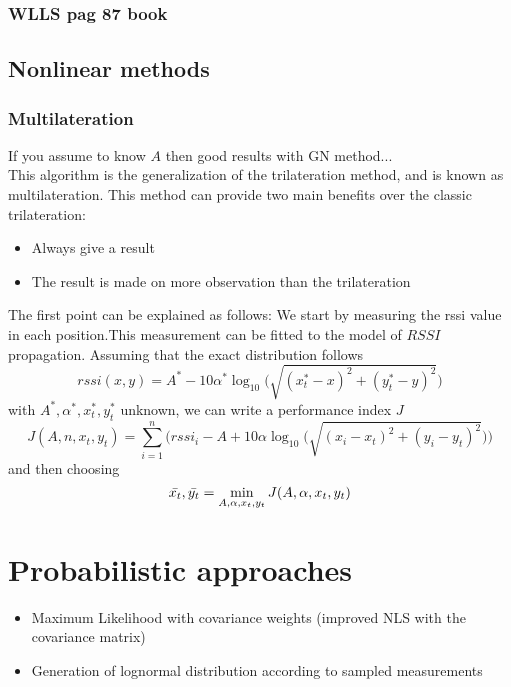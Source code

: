\documentclass[12pt]{article}
\begin{document}
\subsubsection{WLLS pag 87 book}

\clearpage

\subsection{Nonlinear methods}
\subsubsection{Multilateration}
If you assume to know $A$ then good results with GN method...\\
This algorithm is the generalization of the trilateration method, and is known as multilateration. 
This method can provide two main benefits over the classic trilateration:
\begin{itemize}
    \item Always give a result
    \item The result is made on more observation than the trilateration
\end{itemize}
The first point can be explained as follows:
We start by measuring the rssi value in each position.This measurement can be fitted to the model of $RSSI$ propagation. Assuming that the exact distribution follows 
\begin{equation}
rssi(x,y)=A^*-10\alpha^*\log_{10}\big(\sqrt{(x_t^*-x)^2+(y_t^*-y)^2}\big)    
\end{equation}
with $A^*,\alpha^*,x^*_t,y^*_t$ unknown, we can write a performance index $J$
\begin{equation}
    J(A,n,x_t,y_t)=\sum_{i=1}^n\bigg(rssi_i-A+10\alpha\log_{10}\big(\sqrt{(x_i-x_t)^2+(y_i-y_t)^2}\big)\bigg)
\end{equation}
and then choosing 
\begin{equation}
\Bar{x_t}, \Bar{y_t}=\min_{A,\alpha,x_t,y_t}J(A,\alpha,x_t,y_t)
\end{equation}

\clearpage

\section{Probabilistic approaches}
\begin{itemize}
    \item Maximum Likelihood with covariance weights (improved NLS with the covariance matrix)
    \item Generation of lognormal distribution according to sampled measurements
\end{itemize}
\clearpage
\end{document}
